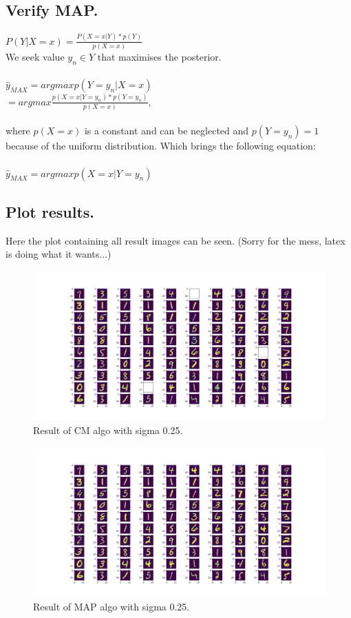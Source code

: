 \documentclass{article}
\begin{document}
\subsection{Verify MAP.}
$P(Y | X = x) = \frac{P( X = x | Y) * p(Y)}{p(X = x)}$\\
We seek value $y_n \in Y$ that maximises the posterior.\\\\
$\hat{y}_{MAX} = argmax p(Y = y_n | X = x)$\\
$ = argmax \frac{p(X = x | Y = y_n) * p(Y = y_n)}{p(X = x)},$\\\\
where $p(X = x)$ is a constant and can be neglected and $p(Y=y_n) = 1$ because of the uniform distribution. Which brings the following equation:\\\\
$\hat{y}_{MAX} = argmax p(X = x | Y = y_n)$\\

\subsection{Plot results.}
Here the plot containing all result images can be seen. (Sorry for the mess, latex is doing what it wants...) \\
\begin{figure}[h]
  \includegraphics[width=\linewidth]{sigma_025_cm.png}
  \caption{Result of CM algo with sigma 0.25.}
  \label{fig:cm025}
\end{figure}

\begin{figure}[h]
  \includegraphics[width=\linewidth]{sigma_025_map.png}
  \caption{Result of MAP algo with sigma 0.25.}
  \label{fig:map025}
\end{figure}
\end{document}
